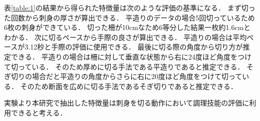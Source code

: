 表\ref{table:1}の結果から得られた特徴量は次のような評価の基準になる．
まず切った回数から刺身の厚さが算出できる．
平造りのデータの場合5回切っているため6枚の刺身ができている．
切った柵が10cmなため6等分した結果一枚約1.6cmとわかる．
次に切るペースから手際の良さが算出できる．
平造りの場合は平均ペースが3.12秒と手際の評価に使用できる．
最後に切る際の角度から切り方が推定できる．
平造りの場合は柵に対して垂直な状態から右に24度ほど角度をつけて切っている．
そのため厚めに切る手法である平造りであると推定できる．
そぎ切りの場合だと平造りの角度からさらに右に20度ほど角度をつけて切っている．
そのため断面を広めに切る手法であるそぎ切りであると推定できる．

実験より本研究で抽出した特徴量は刺身を切る動作において調理技能の評価に利用できると考える．


